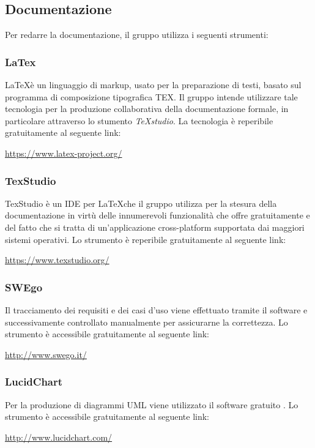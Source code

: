 \documentclass[../NormediProgetto.tex]{subfiles}
\begin{document}
	
	\subsection{Documentazione}
	
	Per redarre la documentazione, il gruppo utilizza i seguenti strumenti:
	
	\subsubsection{LaTex}
	\LaTeX è un linguaggio di markup, usato per la preparazione di testi, basato sul programma di composizione tipografica TEX. Il gruppo intende utilizzare tale tecnologia per la produzione collaborativa della documentazione formale, in particolare attraverso lo stumento \textit{TeXstudio}. La tecnologia è reperibile gratuitamente al seguente link:
	\begin{center}
		\url{https://www.latex-project.org/}
	\end{center}
		
	\subsubsection{TexStudio}
	TexStudio è un IDE per \LaTeX che il gruppo utilizza per la stesura della documentazione in virtù delle innumerevoli funzionalità che offre gratuitamente e del fatto che si tratta di un'applicazione cross-platform supportata dai maggiori sistemi operativi. Lo strumento è reperibile gratuitamente al seguente link:
	\begin{center}
		\url{https://www.texstudio.org/}
	\end{center}
		
	\subsubsection{SWEgo} Il tracciamento dei requisiti e dei casi d'uso viene effettuato tramite il software  e successivamente controllato manualmente per assicurarne la correttezza. Lo strumento è accessibile gratuitamente al seguente link:
	\begin{center}
		\url{http://www.swego.it/}
	\end{center}
		
	\subsubsection{LucidChart}
	Per la produzione di diagrammi UML viene utilizzato il software gratuito . Lo strumento è accessibile gratuitamente al seguente link:
	\begin{center}
		\url{http://www.lucidchart.com/}
	\end{center}
\end{document}
